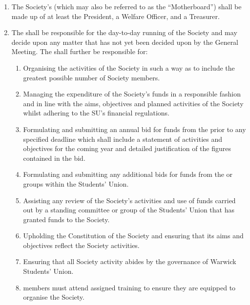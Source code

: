 \documentclass[a4paper,11pt,parskip=half-]{scrartcl} %
\begin{document}
    \begin{enumerate}
        \item The Society's \exec (which may also be referred to as the ``Motherboard'') shall be made up of at least the President, a Welfare Officer, and a Treasurer.
        
        \item The \exec shall be responsible for the day-to-day running of the Society and may decide upon any matter that has not yet been decided upon by the General Meeting. The \exec shall further be responsible for:
            \begin{enumerate}
                \item Organising the activities of the Society in such a way as to include the greatest possible number of Society members.

                \item Managing the expenditure of the Society's funds in a responsible fashion and in line with the aims, objectives and planned activities of the Society whilst adhering to the SU's financial regulations.

                \item Formulating and submitting an annual bid for funds from the \exec prior to any specified deadline which shall include a statement of activities and objectives for the coming year and detailed justification of the figures contained in the bid.

                \item Formulating and submitting any additional bids for funds from the \exec or groups within the Students' Union.

                \item Assisting any review of the Society's activities and use of funds carried out by a standing committee or group of the Students' Union that has granted funds to the Society.

                \item Upholding the Constitution of the Society and ensuring that its aims and objectives reflect the Society activities.

                \item Ensuring that all Society activity abides by the governance of Warwick Students' Union.

                \item \exec members must attend assigned training to ensure they are equipped to organise the Society.
            \end{enumerate}
        

\end{enumerate}
\end{document}
